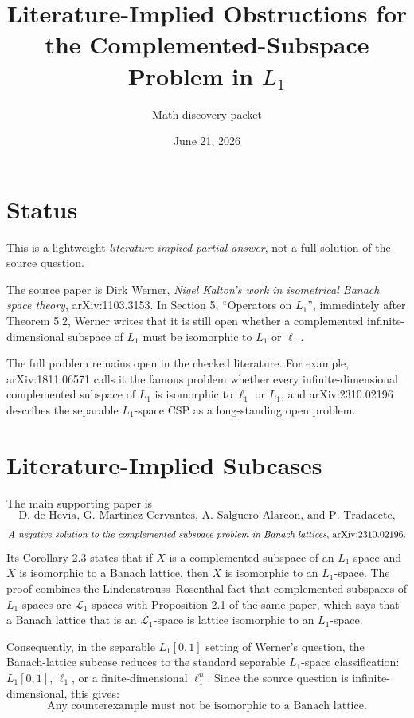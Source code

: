 \documentclass[11pt]{article}
\title{Literature-Implied Obstructions for the Complemented-Subspace Problem in \(L_1\)}
\author{Math discovery packet}
\date{June 21, 2026}
\newcommand{\ellone}{\ell_1}
\newcommand{\Lone}{\mathcal L_1}
\begin{document}
\maketitle

\section{Status}

This is a lightweight \emph{literature-implied partial answer}, not a full
solution of the source question.

The source paper is Dirk Werner, \emph{Nigel Kalton's work in isometrical
Banach space theory}, arXiv:1103.3153.  In Section 5, ``Operators on
\(L_1\)'', immediately after Theorem 5.2, Werner writes that it is still open
whether a complemented infinite-dimensional subspace of \(L_1\) must be
isomorphic to \(L_1\) or \(\ell_1\).

The full problem remains open in the checked literature.  For example,
arXiv:1811.06571 calls it the famous problem whether every infinite-dimensional
complemented subspace of \(L_1\) is isomorphic to \(\ell_1\) or \(L_1\), and
arXiv:2310.02196 describes the separable \(L_1\)-space CSP as a long-standing
open problem.

\section{Literature-Implied Subcases}

The main supporting paper is
\[
\text{D. de Hevia, G. Martinez-Cervantes, A. Salguero-Alarcon, and
P. Tradacete,}
\]
\[
\text{\emph{A negative solution to the complemented subspace problem in
Banach lattices}, arXiv:2310.02196.}
\]
Its Corollary 2.3 states that if \(X\) is a complemented subspace of an
\(L_1\)-space and \(X\) is isomorphic to a Banach lattice, then \(X\) is
isomorphic to an \(L_1\)-space.  The proof combines the Lindenstrauss--Rosenthal
fact that complemented subspaces of \(L_1\)-spaces are \(\Lone\)-spaces with
Proposition 2.1 of the same paper, which says that a Banach lattice that is an
\(\Lone\)-space is lattice isomorphic to an \(L_1\)-space.

Consequently, in the separable \(L_1[0,1]\) setting of Werner's question, the
Banach-lattice subcase reduces to the standard separable \(L_1\)-space
classification: \(L_1[0,1]\), \(\ellone\), or a finite-dimensional
\(\ell_1^n\).  Since the source question is infinite-dimensional, this gives:
\[
\boxed{\text{Any counterexample must not be isomorphic to a Banach lattice.}}
\]
\end{document}

